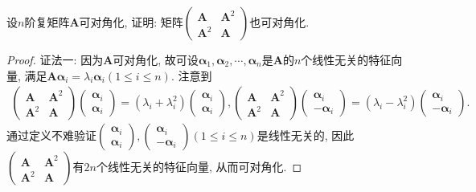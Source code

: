\documentclass[../../main.tex]{subfiles}%
\begin{document}
\begin{example}
设\(n\)阶复矩阵\(\boldsymbol{A}\)可对角化, 证明: 矩阵\(\begin{pmatrix}
\boldsymbol{A}&\boldsymbol{A}^{2}\\
\boldsymbol{A}^{2}&\boldsymbol{A}
\end{pmatrix}\)也可对角化.
\end{example}
\begin{proof}

{\color{blue}证法一:}
因为\(\boldsymbol{A}\)可对角化, 故可设\(\boldsymbol{\alpha}_{1},\boldsymbol{\alpha}_{2},\cdots,\boldsymbol{\alpha}_{n}\)是\(\boldsymbol{A}\)的\(n\)个线性无关的特征向量, 满足\(\boldsymbol{A}\boldsymbol{\alpha}_{i}=\lambda_{i}\boldsymbol{\alpha}_{i}(1\leqslant  i\leqslant  n)\). 注意到
\begin{align*}
\begin{pmatrix}
\boldsymbol{A}&\boldsymbol{A}^{2}\\
\boldsymbol{A}^{2}&\boldsymbol{A}
\end{pmatrix}\begin{pmatrix}
\boldsymbol{\alpha}_{i}\\
\boldsymbol{\alpha}_{i}
\end{pmatrix}=(\lambda_{i}+\lambda_{i}^{2})\begin{pmatrix}
\boldsymbol{\alpha}_{i}\\
\boldsymbol{\alpha}_{i}
\end{pmatrix}, \begin{pmatrix}
\boldsymbol{A}&\boldsymbol{A}^{2}\\
\boldsymbol{A}^{2}&\boldsymbol{A}
\end{pmatrix}\begin{pmatrix}
\boldsymbol{\alpha}_{i}\\
-\boldsymbol{\alpha}_{i}
\end{pmatrix}=(\lambda_{i}-\lambda_{i}^{2})\begin{pmatrix}
\boldsymbol{\alpha}_{i}\\
-\boldsymbol{\alpha}_{i}
\end{pmatrix}.
\end{align*}
通过定义不难验证\(\begin{pmatrix}
\boldsymbol{\alpha}_{i}\\
\boldsymbol{\alpha}_{i}
\end{pmatrix},\begin{pmatrix}
\boldsymbol{\alpha}_{i}\\
-\boldsymbol{\alpha}_{i}
\end{pmatrix}(1\leqslant  i\leqslant  n)\)是线性无关的, 因此\(\begin{pmatrix}
\boldsymbol{A}&\boldsymbol{A}^{2}\\
\boldsymbol{A}^{2}&\boldsymbol{A}
\end{pmatrix}\)有\(2n\)个线性无关的特征向量, 从而可对角化. 


\end{proof}
\end{document}
